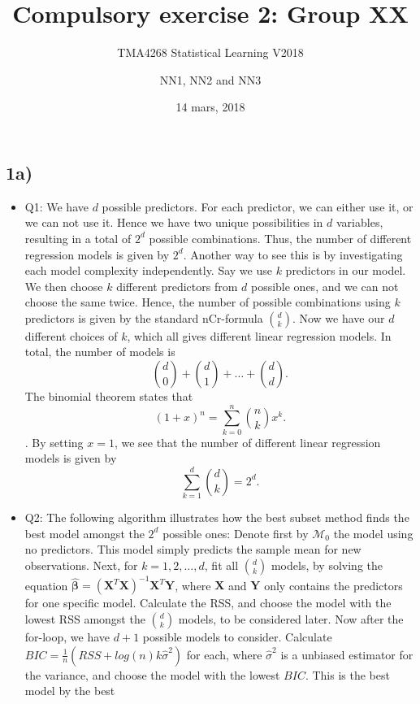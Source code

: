 \documentclass[]{article}
\title{Compulsory exercise 2: Group XX}
\subtitle{TMA4268 Statistical Learning V2018}
\author{NN1, NN2 and NN3}
\date{14 mars, 2018}
\providecommand{\tightlist}{%
  \setlength{\itemsep}{0pt}\setlength{\parskip}{0pt}}
\begin{document}
\maketitle

\subsection{1a)}\label{a}

\begin{itemize}
\tightlist
\item
  Q1: We have \(d\) possible predictors. For each predictor, we can
  either use it, or we can not use it. Hence we have two unique
  possibilities in \(d\) variables, resulting in a total of \(2^d\)
  possible combinations. Thus, the number of different regression models
  is given by \(2^d\). Another way to see this is by investigating each
  model complexity independently. Say we use \(k\) predictors in our
  model. We then choose \(k\) different predictors from \(d\) possible
  ones, and we can not choose the same twice. Hence, the number of
  possible combinations using \(k\) predictors is given by the standard
  nCr-formula \(\binom{d}{k}\). Now we have our \(d\) different choices
  of \(k\), which all gives different linear regression models. In
  total, the number of models is
  \[\binom{d}{0}+\binom{d}{1}+\dots+\binom{d}{d}.\] The binomial theorem
  states that \[(1+x)^n=\sum_{k=0}^n \binom{n}{k} x^k.\]. By setting
  \(x=1\), we see that the number of different linear regression models
  is given by \[\sum_{k=1}^d \binom{d}{k}=2^d.\]
\item
  Q2: The following algorithm illustrates how the best subset method
  finds the best model amongst the \(2^d\) possible ones: Denote first
  by \(\mathcal{M}_0\) the model using no predictors. This model simply
  predicts the sample mean for new observations. Next, for
  \(k=1,2,\dots,d\), fit all \(\binom{d}{k}\) models, by solving the
  equation
  \(\hat{\boldsymbol \beta} =(\boldsymbol X^T \boldsymbol X)^{-1} \boldsymbol X^T \boldsymbol Y\),
  where \(\boldsymbol{X}\) and \(\boldsymbol{Y}\) only contains the
  predictors for one specific model. Calculate the RSS, and choose the
  model with the lowest RSS amongst the \(\binom{d}{k}\) models, to be
  considered later. Now after the for-loop, we have \(d+1\) possible
  models to consider. Calculate
  \(BIC=\frac{1}{n}(RSS+log(n)k\hat \sigma^2)\) for each, where
  \(\hat \sigma^2\) is a unbiased estimator for the variance, and choose
  the model with the lowest \(BIC\). This is the best model by the best

\end{itemize}
\end{document}
